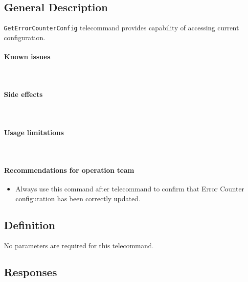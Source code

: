 

\subsection{General Description}
\texttt{GetErrorCounterConfig} telecommand provides capability of accessing current
 configuration. 

\paragraph{Known issues} \mbox{} \\
\None

\paragraph{Side effects} \mbox{} \\
\None

\paragraph{Usage limitations} \mbox{} \\
\None

\paragraph{Recommendations for operation team}
\begin{itemize}
    \item Always use this command after  telecommand 
    to confirm that Error Counter configuration has been correctly updated.
\end{itemize}

\subsection{Definition}

No parameters are required for this telecommand.

\subsection{Responses}

